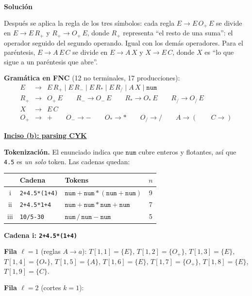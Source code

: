 \documentclass[12pt, letterpaper]{article}
\newcommand{\tk}[1]{\mathtt{#1}}
\newenvironment{solucion}{\par\medskip\noindent\textbf{\large Solución}\par\smallskip}{\par\bigskip}
\begin{document}
\begin{enumerate}
\begin{solucion}
  Después se aplica la regla de los tres símbolos: cada regla
  $E \to E\,O_{+}\,E$ se divide en $E \to E\,R_{+}$ y $R_{+} \to O_{+}\,E$, donde
  $R_{+}$ representa ``el resto de una suma'': el operador seguido del segundo
  operando. Igual con los demás operadores. Para el paréntesis,
  $E \to A\,E\,C$ se divide en $E \to A\,X$ y $X \to E\,C$, donde $X$ es ``lo que
  sigue a un paréntesis que abre''.

  \textbf{Gramática en FNC} (12 no terminales, 17 producciones):
  \[
  \begin{array}{rcl}
    E &\to& E\,R_{+} \mid E\,R_{-} \mid E\,R_{*} \mid E\,R_{/} \mid A\,X \mid \tk{num} \\[2pt]
    R_{+} &\to& O_{+}\,E \qquad R_{-} \to O_{-}\,E \qquad R_{*} \to O_{*}\,E \qquad R_{/} \to O_{/}\,E \\[2pt]
    X &\to& E\,C \\[2pt]
    O_{+} &\to& + \qquad O_{-} \to - \qquad O_{*} \to * \qquad O_{/} \to / \qquad A \to ( \qquad C \to )
  \end{array}
  \]

  \medskip\noindent\textbf{\underline{Inciso (b): parsing CYK}}

  \textbf{Tokenización.} El enunciado indica que $\tk{num}$ cubre enteros y
  flotantes, así que \texttt{4.5} es \emph{un solo} token. Las cadenas quedan:

  \begin{center}
    \begin{tabular}{c l l c}
      \toprule
      & Cadena & Tokens & $n$ \\
      \midrule
      i   & \texttt{2+4.5*(1+4)} & $\tk{num} + \tk{num} * ( \tk{num} + \tk{num} )$ & 9 \\
      ii  & \texttt{2+4.5*1+4}   & $\tk{num} + \tk{num} * \tk{num} + \tk{num}$     & 7 \\
      iii & \texttt{10/5-30}     & $\tk{num} \,/\, \tk{num} - \tk{num}$           & 5 \\
      \bottomrule
    \end{tabular}
  \end{center}


  \medskip\noindent\textbf{Cadena i: \texttt{2+4.5*(1+4)}}
  
  \textbf{Fila $\ell=1$} (reglas $A \to a$): $T[1,1] = \{E\}$, $T[1,2] = \{O_{+}\}$, $T[1,3] = \{E\}$, $T[1,4] = \{O_{*}\}$, $T[1,5] = \{A\}$, $T[1,6] = \{E\}$, $T[1,7] = \{O_{+}\}$, $T[1,8] = \{E\}$, $T[1,9] = \{C\}$.
  
  \textbf{Fila $\ell=2$} (cortes $k=1$):
  

\end{solucion}
\end{enumerate}
\end{document}
